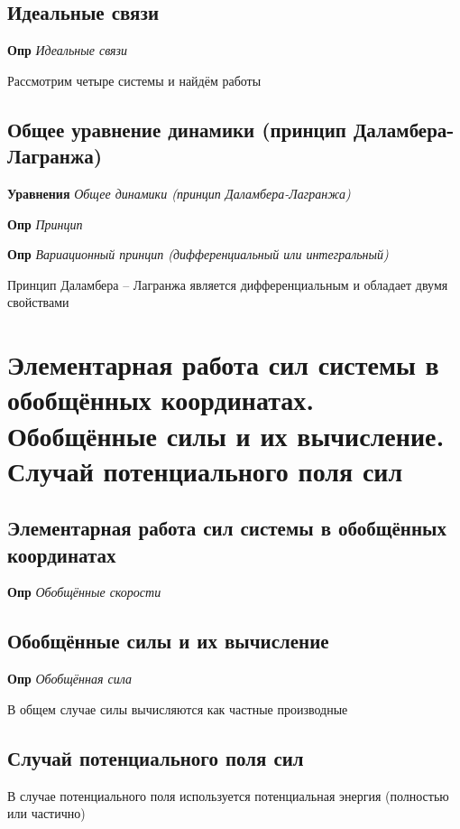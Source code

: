 \documentclass[a4paper, 14pt]{article}
\begin{document}
    \subsection{Идеальные связи}
    
    \textbf{Опр} \textit{Идеальные связи}
    
    Рассмотрим четыре системы и найдём работы
    
    \subsection{Общее уравнение динамики (принцип Даламбера-Лагранжа)}
    
    \textbf{Уравнения} \textit{Общее динамики (принцип Даламбера-Лагранжа)}
    
    \textbf{Опр} \textit{Принцип}
    
    \textbf{Опр} \textit{Вариационный принцип (дифференциальный или интегральный)}
    
    Принцип Даламбера -- Лагранжа является дифференциальным и обладает двумя свойствами
    
    \section{Элементарная работа сил системы в обобщённых координатах.
    Обобщённые силы и их вычисление.
    Случай потенциального поля сил}
    
    \subsection{Элементарная работа сил системы в обобщённых координатах}
    
    \textbf{Опр} \textit{Обобщённые скорости}
    
    \subsection{Обобщённые силы и их вычисление}
    
    \textbf{Опр} \textit{Обобщённая сила}
    
    В общем случае силы вычисляются как частные производные
    
    \subsection{Случай потенциального поля сил}
    
    В случае потенциального поля используется потенциальная энергия (полностью или частично)
    
\end{document}
